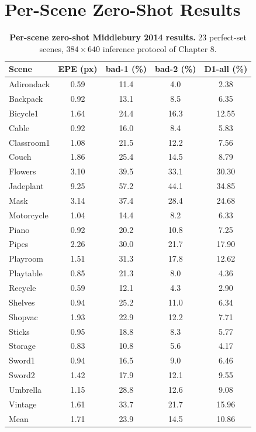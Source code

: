 \section{Per-Scene Zero-Shot Results}
\begin{table}[H]
\centering
\caption{\textbf{Per-scene zero-shot Middlebury 2014 results.} 23 perfect-set scenes, $384\times 640$ inference protocol of Chapter 8.}
\label{tab:mb14_perscene_full}
\small
\begin{tabular}{lcccc}
\toprule
Scene & EPE (px) & bad-1 (\%) & bad-2 (\%) & D1-all (\%)\\
\midrule
Adirondack & 0.59 & 11.4 & 4.0 & 2.38\\
Backpack & 0.92 & 13.1 & 8.5 & 6.35\\
Bicycle1 & 1.64 & 24.4 & 16.3 & 12.55\\
Cable & 0.92 & 16.0 & 8.4 & 5.83\\
Classroom1 & 1.08 & 21.5 & 12.2 & 7.56\\
Couch & 1.86 & 25.4 & 14.5 & 8.79\\
Flowers & 3.10 & 39.5 & 33.1 & 30.30\\
Jadeplant & 9.25 & 57.2 & 44.1 & 34.85\\
Mask & 3.14 & 37.4 & 28.4 & 24.68\\
Motorcycle & 1.04 & 14.4 & 8.2 & 6.33\\
Piano & 0.92 & 20.2 & 10.8 & 7.25\\
Pipes & 2.26 & 30.0 & 21.7 & 17.90\\
Playroom & 1.51 & 31.3 & 17.8 & 12.62\\
Playtable & 0.85 & 21.3 & 8.0 & 4.36\\
Recycle & 0.59 & 12.1 & 4.3 & 2.90\\
Shelves & 0.94 & 25.2 & 11.0 & 6.34\\
Shopvac & 1.93 & 22.9 & 12.2 & 7.71\\
Sticks & 0.95 & 18.8 & 8.3 & 5.77\\
Storage & 0.83 & 10.8 & 5.6 & 4.17\\
Sword1 & 0.94 & 16.5 & 9.0 & 6.46\\
Sword2 & 1.42 & 17.9 & 12.1 & 9.55\\
Umbrella & 1.15 & 28.8 & 12.6 & 9.08\\
Vintage & 1.61 & 33.7 & 21.7 & 15.96\\
\midrule
Mean & 1.71 & 23.9 & 14.5 & 10.86\\
\bottomrule
\end{tabular}
\end{table}

